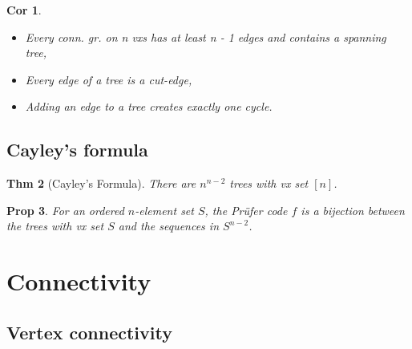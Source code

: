 \documentclass[11pt, fleqn, a4paper, landscape]{article}
\theoremstyle{plain} %
\newtheorem{thm}{Thm}
\newtheorem{pro}[thm]{Prop}
\newtheorem{cor}[thm]{Cor}
\theoremstyle{remark} %
\theoremstyle{definition} %
\newtheorem{defi}[thm]{Def}
\begin{document}
\begin{multicols}{5}
\begin{cor}
\begin{itemize}
\item  Every conn. gr. on n vxs has at least n - 1 edges and contains a spanning tree,
\item Every edge of a tree is a cut-edge,
\item Adding an edge to a tree creates exactly one cycle.
\end{itemize}
\end{cor}

\subsection{Cayley’s formula}
\addtocounter{thm}{1}\addtocounter{thm}{1}
\begin{thm}[Cayley’s Formula]
There are $n^{n-2}$ trees with vx set $[n]$.
\end{thm}

\addtocounter{thm}{2}
\begin{pro}
For an ordered $n$-element set $S$, the Prüfer code $f$ is a bijection between the trees with vx set $S$ and the sequences in $S^{n-2}$.
\end{pro}
\addtocounter{thm}{1}
\addtocounter{thm}{1}

\section{Connectivity}
\subsection{Vertex connectivity}


\end{multicols}
\end{document}
